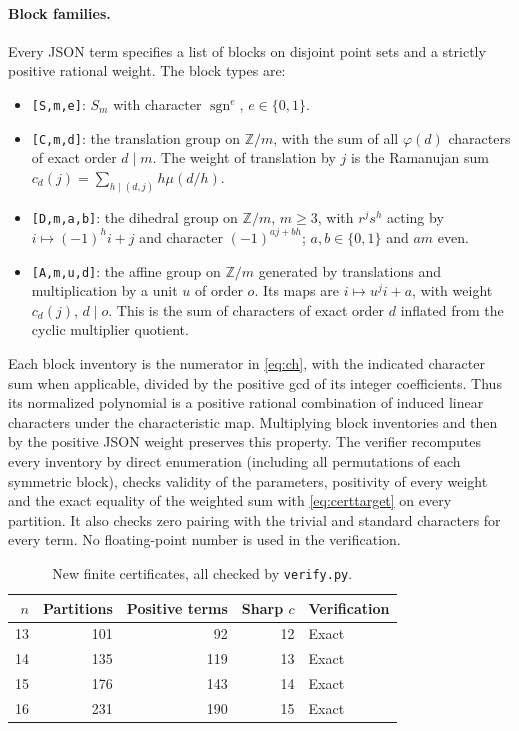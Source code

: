 \documentclass[11pt]{article}
\theoremstyle{remark}
\newcommand{\Z}{\mathbb Z}
\newcommand{\sgn}{\operatorname{sgn}}
\begin{document}
\paragraph{Block families.}
Every JSON term specifies a list of blocks on disjoint point sets and a strictly positive rational weight. The block types are:
\begin{itemize}
\item \texttt{[S,m,e]}: $S_m$ with character $\sgn^e$, $e\in\{0,1\}$.
\item \texttt{[C,m,d]}: the translation group on $\Z/m$, with the sum of all $\varphi(d)$ characters of exact order $d\mid m$. The weight of translation by $j$ is the Ramanujan sum $c_d(j)=\sum_{h\mid(d,j)}h\mu(d/h)$.
\item \texttt{[D,m,a,b]}: the dihedral group on $\Z/m$, $m\ge3$, with $r^j s^h$ acting by $i\mapsto(-1)^h i+j$ and character $(-1)^{aj+bh}$; $a,b\in\{0,1\}$ and $am$ even.
\item \texttt{[A,m,u,d]}: the affine group on $\Z/m$ generated by translations and multiplication by a unit $u$ of order $o$. Its maps are $i\mapsto u^ji+a$, with weight $c_d(j)$, $d\mid o$. This is the sum of characters of exact order $d$ inflated from the cyclic multiplier quotient.
\end{itemize}
Each block inventory is the numerator in \eqref{eq:ch}, with the indicated character sum when applicable, divided by the positive gcd of its integer coefficients. Thus its normalized polynomial is a positive rational combination of induced linear characters under the characteristic map. Multiplying block inventories and then by the positive JSON weight preserves this property. The verifier recomputes every inventory by direct enumeration (including all permutations of each symmetric block), checks validity of the parameters, positivity of every weight and the exact equality of the weighted sum with \eqref{eq:certtarget} on every partition. It also checks zero pairing with the trivial and standard characters for every term. No floating-point number is used in the verification.

\begin{table}[ht]
\centering
\begin{tabular}{rrrrl}\toprule
$n$&Partitions&Positive terms&Sharp $c$&Verification\\\midrule
13&101&92&12&Exact\\
14&135&119&13&Exact\\
15&176&143&14&Exact\\
16&231&190&15&Exact\\\bottomrule
\end{tabular}
\caption{New finite certificates, all checked by \texttt{verify.py}.}
\end{table}
\end{document}
